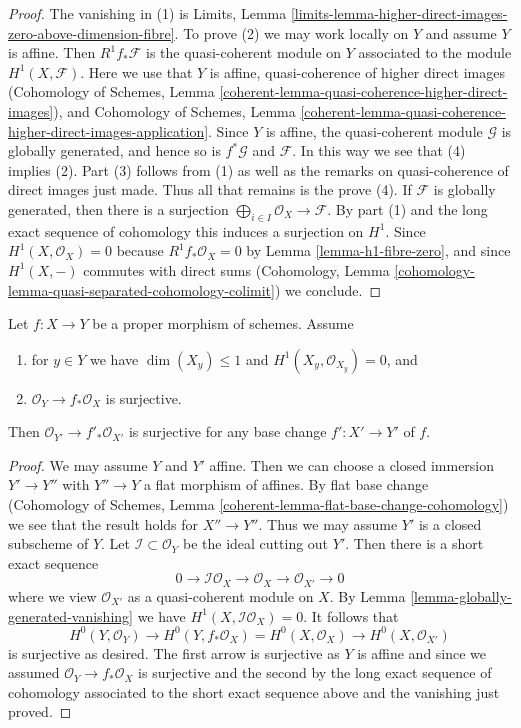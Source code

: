 \begin{proof}
The vanishing in (1) is Limits, Lemma
\ref{limits-lemma-higher-direct-images-zero-above-dimension-fibre}.
To prove (2) we may work locally on $Y$ and assume $Y$ is affine.
Then $R^1f_*\mathcal{F}$ is the quasi-coherent module on $Y$
associated to the module $H^1(X, \mathcal{F})$.
Here we use that $Y$ is affine, quasi-coherence of higher direct
images (Cohomology of Schemes, Lemma
\ref{coherent-lemma-quasi-coherence-higher-direct-images}), and
Cohomology of Schemes, Lemma
\ref{coherent-lemma-quasi-coherence-higher-direct-images-application}.
Since $Y$ is affine, the quasi-coherent module $\mathcal{G}$
is globally generated, and hence so is $f^*\mathcal{G}$
and $\mathcal{F}$.
In this way we see that (4) implies (2).
Part (3) follows from (1) as well as the remarks on
quasi-coherence of direct images just made. Thus
all that remains is the prove (4).
If $\mathcal{F}$ is globally generated, then there is a surjection
$\bigoplus_{i \in I} \mathcal{O}_X \to \mathcal{F}$. By part (1)
and the long exact sequence of cohomology this
induces a surjection on $H^1$. Since $H^1(X, \mathcal{O}_X) = 0$
because $R^1f_*\mathcal{O}_X = 0$ by
Lemma \ref{lemma-h1-fibre-zero}, and
since $H^1(X, -)$ commutes with direct sums
(Cohomology, Lemma \ref{cohomology-lemma-quasi-separated-cohomology-colimit})
we conclude.
\end{proof}

\begin{lemma}
\label{lemma-h1-fibre-zero-check-h0-kappa}
Let $f : X \to Y$ be a proper morphism of schemes. Assume
\begin{enumerate}
\item for $y \in Y$ we have $\dim(X_y) \leq 1$ and
$H^1(X_y, \mathcal{O}_{X_y}) = 0$, and
\item $\mathcal{O}_Y \to f_*\mathcal{O}_X$ is surjective.
\end{enumerate}
Then $\mathcal{O}_{Y'} \to f'_*\mathcal{O}_{X'}$ is surjective
for any base change $f' : X' \to Y'$ of $f$.
\end{lemma}

\begin{proof}
We may assume $Y$ and $Y'$ affine. Then we can choose a closed
immersion $Y' \to Y''$ with $Y'' \to Y$ a flat morphism of affines.
By flat base change
(Cohomology of Schemes, Lemma \ref{coherent-lemma-flat-base-change-cohomology})
we see that the result holds for $X'' \to Y''$.
Thus we may assume $Y'$ is a closed subscheme of $Y$.
Let $\mathcal{I} \subset \mathcal{O}_Y$ be the ideal cutting out $Y'$.
Then there is a short exact sequence
$$
0 \to \mathcal{I}\mathcal{O}_X \to
\mathcal{O}_X \to \mathcal{O}_{X'} \to 0
$$
where we view $\mathcal{O}_{X'}$ as a quasi-coherent module on $X$.
By Lemma \ref{lemma-globally-generated-vanishing}
we have $H^1(X, \mathcal{I}\mathcal{O}_X) = 0$.
It follows that
$$
H^0(Y, \mathcal{O}_Y) \to
H^0(Y, f_*\mathcal{O}_X) = H^0(X, \mathcal{O}_X) \to
H^0(X, \mathcal{O}_{X'})
$$
is surjective as desired. The first arrow is surjective as $Y$
is affine and since we assumed $\mathcal{O}_Y \to f_*\mathcal{O}_X$
is surjective and the second by the long exact sequence of
cohomology associated to the short exact sequence above and
the vanishing just proved.
\end{proof}

